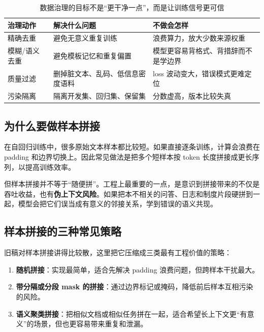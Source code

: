 \begin{table}[H]
\centering
\small
\begin{tabularx}{\textwidth}{>{\raggedright\arraybackslash}p{3cm}>{\raggedright\arraybackslash}p{3.1cm}>{\raggedright\arraybackslash}X}
\toprule
\textbf{治理动作} & \textbf{解决什么问题} & \textbf{不做会怎样} \\
\midrule
精确去重 & 避免无意义重复训练 & 浪费算力，放大少数来源权重 \\
模糊/语义去重 & 避免模板记忆和重复偏置 & 模型更容易背格式、背措辞而不是学边界 \\
质量过滤 & 删掉脏文本、乱码、低信息密度语料 & loss 波动变大，错误模式更难定位 \\
污染隔离 & 隔离开发集、回归集、保留集 & 分数虚高，版本比较失真 \\
\bottomrule
\end{tabularx}
\caption{数据治理的目标不是“更干净一点”，而是让训练信号更可信}
\label{tab:data-governance-actions}
\end{table}

\subsection{为什么要做样本拼接}
在自回归训练中，很多原始文本样本都比较短。如果直接逐条训练，计算会浪费在 padding 和边界切换上。因此常见做法是把多个短样本按 token 长度拼接成更长序列，以提高训练效率。

但样本拼接并不等于“随便拼”。工程上最重要的一点，是意识到拼接带来的不仅是吞吐收益，也有\textbf{伪上下文风险}。如果把本不相关的问答、日志和制度片段硬拼到一起，模型会把它们误当成有意义的邻接关系，学到错误的语义共现。

\subsection{样本拼接的三种常见策略}
旧稿对样本拼接讲得比较散，这里把它压缩成三类最有工程价值的策略：
\begin{enumerate}
  \item \textbf{随机拼接}：实现最简单，适合先解决 padding 浪费问题，但跨样本干扰最大。
  \item \textbf{带分隔或分段 mask 的拼接}：通过边界标记或掩码，降低前后样本互相污染的风险。
  \item \textbf{语义聚类拼接}：把相似文档或相似任务拼在一起，适合希望长上下文更“有意义”的场景，但也更容易带来重复和泄漏。
\end{enumerate}

